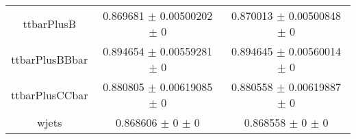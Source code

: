 \begin{table}
\begin{tabular}{ccc}
ttbarPlusB & \num{0.869681} $\pm$ \num{0.00500202} $\pm$ \num{0} & \num{0.870013} $\pm$ \num{0.00500848} $\pm$ \num{0}\\
ttbarPlusBBbar & \num{0.894654} $\pm$ \num{0.00559281} $\pm$ \num{0} & \num{0.894645} $\pm$ \num{0.00560014} $\pm$ \num{0}\\
ttbarPlusCCbar & \num{0.880805} $\pm$ \num{0.00619085} $\pm$ \num{0} & \num{0.880558} $\pm$ \num{0.00619887} $\pm$ \num{0}\\
wjets & \num{0.868606} $\pm$ \num{0} $\pm$ \num{0} & \num{0.868558} $\pm$ \num{0} $\pm$ \num{0}\\
\bottomrule
\end{tabular}
\end{table}